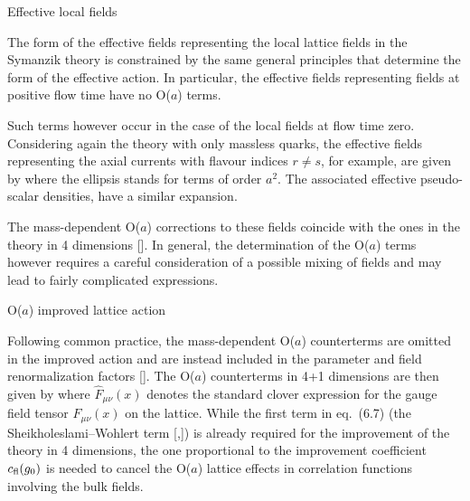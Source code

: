  Effective local fields

The form of the effective fields representing
the local lattice fields in the Symanzik theory
is constrained by the same general principles
that determine the form of the effective action.
In particular, the effective fields representing fields at positive
flow time have no O($a$) terms.

Such terms however occur in the case of the local
fields at flow time zero.
Considering again the theory with only massless quarks,
the effective fields representing the 
axial currents with flavour indices $r\neq s$, 
for example, are given by
where the ellipsis stands for terms of order $a^2$.
The associated effective pseudo-scalar densities,
have a similar expansion.

The mass-dependent O($a$) corrections to these fields 
coincide with the ones in the theory in 4 dimensions
[\cite{ImpNonD}].
In general, the determination of the O($a$) 
terms however requires a careful consideration of a possible mixing
of fields and may lead to fairly complicated expressions.


\/ {\rm O($a$)\kern-0.5pt} improved lattice action

Following common practice, 
the mass-dependent O($a$) counterterms
are omitted in the improved action and are instead included
in the parameter and field renormalization factors [\cite{SFimp}].
The O($a$) counterterms
in 4+1 dimensions are then given by
where $\widehat{F}_{\mu\nu}(x)$ denotes the standard clover
expression for the gauge field tensor $F_{\mu\nu}(x)$ on the lattice.
While the first term in eq.~(6.7) (the Sheikholeslami--Wohlert term 
[\cite{SW},\cite{SFimp}]) is already required for the 
improvement of the theory in 4 dimensions, the one
proportional to the improvement
coefficient $c_{\rm fl}(g_0)$
is needed to cancel the O($a$) lattice
effects in correlation functions involving the bulk fields.


